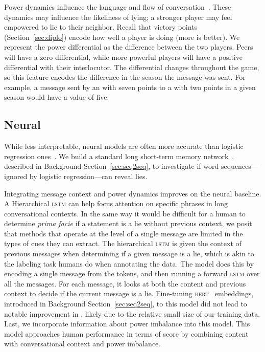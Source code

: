 Power dynamics influence the language and flow of
conversation~\citep{danescu2012echoes, danescu2013computational,
  prabhakaran2013power}.
%
%
These dynamics may influence the likeliness of lying; a stronger
player may feel empowered to lie to their neighbor.
%
Recall that victory points (Section~\ref{sec:diplo}) encode how well a
player is doing (more is better).
%
We represent the power differential as the difference between the two players.
%
Peers will have a zero differential, while more powerful players will
have a positive differential with their interlocutor.
%
The differential changes throughout the game, so this feature encodes
the difference in the season the message was sent.
%
 For example, a message sent by an  with seven points to
 a  with two points in a given season would have a
 value of five.


\subsection{Neural}


While less interpretable, neural models are often more accurate than
logistic regression ones~\citep{ribeiro2016should, belinkov2019analysis}.
%
We build a standard long short-term memory
network~\citep[]{hochreiter1997long}, described in Background Section~\ref{sec:seq2seq}, to investigate if word
sequences---ignored by logistic regression---can reveal lies.

Integrating message context and power dynamics improves on the neural baseline.  
%
A Hierarchical \textsc{lstm} can help focus attention on specific
phrases in long conversational contexts.
%
In the same way it would be difficult for a human to determine
\textit{prima facie} if a statement is a lie without previous context,
we posit that methods that operate at the level of a single message
are limited in the types of cues they can extract.
%
The hierarchical \textsc{lstm} is given the context of previous
messages when determining if a given message is a lie, which is akin
to the labeling task humans do when annotating the data.
%
The model does this by encoding a single message from the tokens, and
then running a forward \textsc{lstm} over all the messages. For each
message, it looks at both the content and previous context to decide
if the current message is a lie.
%
Fine-tuning \textsc{bert}~\citep{devlin2018bert} embeddings, introduced in Background Section~\ref{sec:seq2seq}, to this
model did not lead to notable improvement in \fone{}, likely due
to the relative small size of our training data.
%
Last, we incorporate information about power imbalance into this model.
%
This model approaches human performance in terms of \fone{} score by combining content with conversational context and power imbalance.  

